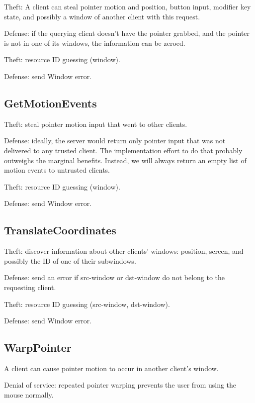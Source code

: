 Theft: A client can steal pointer motion and position, button input,
modifier key state, and possibly a window of another client with this
request.

Defense: if the querying client doesn't have the pointer grabbed, and
the pointer is not in one of its windows, the information can be
zeroed.

Theft: resource ID guessing (window).

Defense: send Window error.



\subsection{GetMotionEvents}

Theft: steal pointer motion input that went to other clients.

Defense: ideally, the server would return only pointer input that was
not delivered to any trusted client.  The implementation effort to do
that probably outweighs the marginal benefits.  Instead, we will
always return an empty list of motion events to untrusted clients.

Theft: resource ID guessing (window).

Defense: send Window error.



\subsection{TranslateCoordinates}

Theft: discover information about other clients' windows: position,
screen, and possibly the ID of one of their subwindows.

Defense: send an error if src-window or dst-window do not belong
to the requesting client.

Theft: resource ID guessing (src-window, dst-window).

Defense: send Window error.



\subsection{WarpPointer}

A client can cause pointer motion to occur in another client's window.

Denial of service: repeated pointer warping prevents the user from
using the mouse normally.

